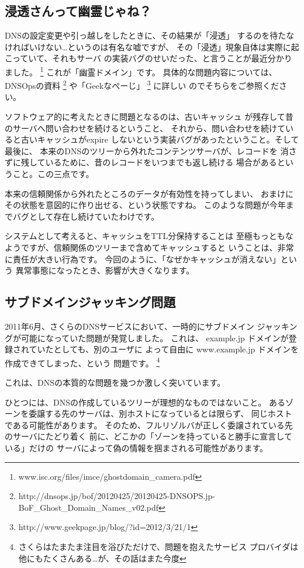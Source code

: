\subsection{ 浸透さんって幽霊じゃね？ }

DNSの設定変更や引っ越しをしたときに、その結果が「浸透」
するのを待たなければいけない…というのは有名な嘘ですが、
その「浸透」現象自体は実際に起こっていて、それもサーバ
の実装バグのせいだった、と言うことが最近分かりました。
\footnote{www.isc.org/files/imce/ghostdomain\_camera.pdf}
これが「幽霊ドメイン」です。 
具体的な問題内容については、DNSOpsの資料 
\footnote{http://dnsops.jp/bof/20120425/20120425-DNSOPS.jp-BoF\_Ghost\_Domain\_Names\_v02.pdf}
や「Geekなぺーじ」
\footnote{http://www.geekpage.jp/blog/?id=2012/3/21/1} に詳しい
のでそちらをご参照ください。

ソフトウェア的に考えたときに問題となるのは、古いキャッシュ
が残存して昔のサーバへ問い合わせを続けるということ、
それから、問い合わせを続けていると古いキャッシュがexpire
しないという実装バグがあったということ。そして最後に、
本来のDNSのツリーから外れたコンテンツサーバが、レコードを
消さずに残しているために、昔のレコードをいつまでも返し続ける
場合があるということ。この三点です。

本来の信頼関係から外れたところのデータが有効性を持ってしまい、
おまけにその状態を意図的に作り出せる、という状態ですね。
このような問題が今年までバグとして存在し続けていたわけです。

システムとして考えると、キャッシュをTTL分保持することは
至極もっともなようですが、信頼関係のツリーまで含めてキャッシュすると
いうことは、非常に責任が大きい行為です。
今回のように、「なぜかキャッシュが消えない」という
異常事態になったとき、影響が大きくなります。


\subsection{ サブドメインジャッキング問題 }
2011年6月、さくらのDNSサービスにおいて、一時的にサブドメイン
ジャッキングが可能になっていた問題が発覚しました。
これは、 example.jp ドメインが登録されていたとしても、別のユーザに
よって自由に www.example.jp ドメインを作成できてしまった、という
問題です。
\footnote{さくらはたまたま注目を浴びただけで、問題を抱えたサービス
プロバイダは他にもたくさんある…が、その話はまた今度}

これは、DNSの本質的な問題を幾つか激しく突いています。

ひとつには、DNSの作成しているツリーが理想的なものではないこと。
あるゾーンを委譲する先のサーバは、別ホストになっているとは限らず、
同じホストである可能性があります。
そのため、フルリゾルバが正しく委譲されている先のサーバにたどり着く
前に、どこかの「ゾーンを持っていると勝手に宣言している」だけの
サーバによって偽の情報を掴まされる可能性があります。

